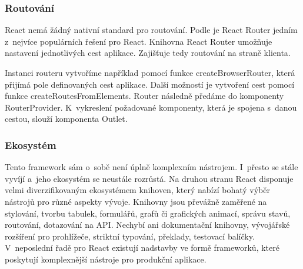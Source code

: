 \subsubsection{Routování}

React nemá žádný nativní standard pro routování. Podle \cite{reactbanks} je React Router jedním z~nejvíce populárních řešení pro React. 
Knihovna React Router umožňuje nastavení jednotlivých cest aplikace. Zajišťuje tedy routování na straně klienta.

Instanci routeru vytvoříme například pomocí funkce createBrowserRouter, která přijímá pole definovaných cest aplikace. 
Další možností je vytvoření cest pomocí funkce createRoutesFromElements. Router následně předáme do komponenty RouterProvider. 
K~vykreslení požadované komponenty, která je spojena s~danou cestou, slouží komponenta Outlet.\cite{reactbanks,reactrouter}

\subsubsection{Ekosystém}

Tento framework sám o~sobě není úplně komplexním nástrojem. I~přesto se stále vyvíjí a~jeho ekosystém se neustále rozrůstá. 
Na druhou stranu React disponuje velmi diverzifikovaným ekosystémem knihoven, který nabízí bohatý výběr nástrojů pro různé aspekty vývoje. 
Knihovny jsou převážně zaměřené na stylování, tvorbu tabulek, formulářů, grafů či grafických animací, správu stavů, routování, dotazování na API. 
Nechybí ani dokumentační knihovny, vývojářské rozšíření pro prohlížeče, striktní typování, překlady, testovací balíčky. 
V~neposlední řadě pro React existují nadstavby ve formě frameworků, které poskytují komplexnější nástroje pro produkční aplikace.\cite{awesomereact,builderreacteco,react}